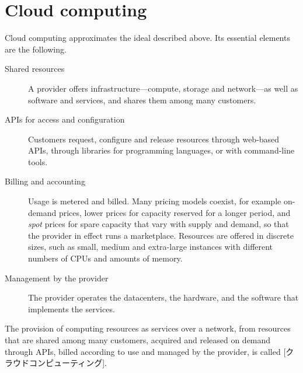 \documentclass[../main.tex]{subfiles}
\begin{document}
\section{Cloud computing}
\label{sec:l16-cloud}

Cloud computing approximates the ideal described above.  Its essential elements are the
following.
\begin{description}
  \item[Shared resources] A provider offers infrastructure---compute, storage
    and network---as well as software and services, and shares them among
    many customers.
  \item[APIs for access and configuration] Customers request, configure and
    release resources through web-based APIs, through libraries for
    programming languages, or with command-line tools.
  \item[Billing and accounting] Usage is metered and billed.  Many pricing
    models coexist, for example on-demand prices, lower prices for capacity
    reserved for a longer period, and \emph{spot} prices for spare capacity
    that vary with supply and demand, so that the provider in effect runs a
    marketplace.  Resources are offered in discrete sizes, such as small,
    medium and extra-large instances with different numbers of CPUs and
    amounts of memory.
  \item[Management by the provider] The provider operates the datacenters,
    the hardware, and the software that implements the services.
\end{description}

\begin{definition}
  The provision of computing resources as services over a network, from
  resources that are shared among many customers, acquired and released on
  demand through APIs, billed according to use and managed by the provider,
  is called [クラウドコンピューティング].
\end{definition}
\end{document}
